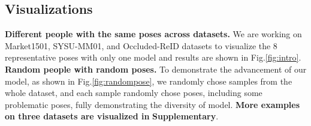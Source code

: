 \subsection{Visualizations}

\textbf{Different people with the same poses across datasets.}
We are working on Market1501, SYSU-MM01, and
Occluded-ReID datasets to visualize the 8 representative poses with only one model and results are shown in Fig.\ref{fig:intro}.
\\
\textbf{Random people with random poses.} To demonstrate the advancement of our model, as shown in Fig.\ref{fig:randompose}, we randomly chose samples from the whole dataset, and each sample randomly chose poses, including some problematic poses, fully demonstrating the diversity of model. \textbf{More examples on three datasets are visualized in }\textbf{Supplementary}.




